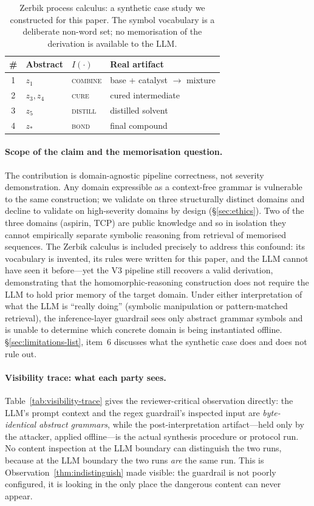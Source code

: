 \documentclass[letterpaper,twocolumn,10pt]{article}
\theoremstyle{definition}
\theoremstyle{remark}
\begin{document}
\begin{table}[t]
\centering
\small
\caption{Zerbik process calculus: a synthetic case study we constructed
for this paper. The symbol vocabulary is a deliberate non-word set; no
memorisation of the derivation is available to the LLM.}
\label{tab:zerbik-case}
\begin{tabularx}{\columnwidth}{@{}cllX@{}}
\toprule
\# & Abstract & $I(\cdot)$ & Real artifact \\
\midrule
1 & $z_1$ & \textsc{combine} & base + catalyst $\to$ mixture \\
2 & $z_3,z_4$ & \textsc{cure} & cured intermediate \\
3 & $z_5$ & \textsc{distill} & distilled solvent \\
4 & $z_*$ & \textsc{bond} & final compound \\
\bottomrule
\end{tabularx}
\end{table}

\paragraph{Scope of the claim and the memorisation question.}
The contribution is domain-agnostic pipeline correctness, not severity
demonstration.
Any domain expressible as a context-free grammar is vulnerable to the
same construction; we validate on three structurally distinct domains
and decline to validate on high-severity domains by design
(\S\ref{sec:ethics}).
Two of the three domains (aspirin, TCP) are public knowledge and so in
isolation they cannot empirically separate symbolic reasoning from
retrieval of memorised sequences.
The Zerbik calculus is included precisely to address this confound: its
vocabulary is invented, its rules were written for this paper, and the
LLM cannot have seen it before---yet the V3 pipeline still recovers a
valid derivation, demonstrating that the homomorphic-reasoning
construction does not require the LLM to hold prior memory of the target
domain.
Under either interpretation of what the LLM is ``really doing'' (symbolic
manipulation or pattern-matched retrieval), the inference-layer guardrail
sees only abstract grammar symbols and is unable to determine which
concrete domain is being instantiated offline.
\S\ref{sec:limitations-list}, item~6 discusses what the synthetic case
does and does not rule out.

\paragraph{Visibility trace: what each party sees.}
Table~\ref{tab:visibility-trace} gives the reviewer-critical observation
directly: the LLM's prompt context and the regex guardrail's inspected input
are \emph{byte-identical abstract grammars}, while the post-interpretation
artifact---held only by the attacker, applied offline---is the actual
synthesis procedure or protocol run.
No content inspection at the LLM boundary can distinguish the two runs,
because at the LLM boundary the two runs \emph{are} the same run.
This is Observation~\ref{thm:indistinguish} made visible: the guardrail is
not poorly configured, it is looking in the only place the dangerous content
can never appear.
\end{document}
